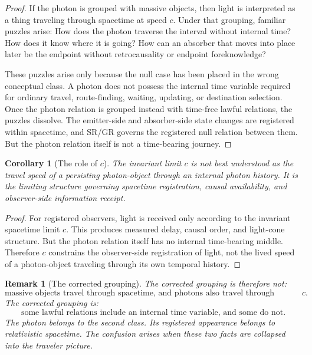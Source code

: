 \documentclass[12pt,onecolumn]{article}
\newtheorem{remark}{Remark}
\newtheorem{corollary}{Corollary}
\begin{document}
\begin{proof}
If the photon is grouped with massive objects, then light is interpreted as a thing traveling through spacetime at speed $c$. Under that grouping, familiar puzzles arise: How does the photon traverse the interval without internal time? How does it know where it is going? How can an absorber that moves into place later be the endpoint without retrocausality or endpoint foreknowledge?

These puzzles arise only because the null case has been placed in the wrong conceptual class. A photon does not possess the internal time variable required for ordinary travel, route-finding, waiting, updating, or destination selection. Once the photon relation is grouped instead with time-free lawful relations, the puzzles dissolve. The emitter-side and absorber-side state changes are registered within spacetime, and SR/GR governs the registered null relation between them. But the photon relation itself is not a time-bearing journey.
\end{proof}

\begin{corollary}[The role of $c$]
The invariant limit $c$ is not best understood as the travel speed of a persisting photon-object through an internal photon history. It is the limiting structure governing spacetime registration, causal availability, and observer-side information receipt.
\end{corollary}

\begin{proof}
For registered observers, light is received only according to the invariant spacetime limit $c$. This produces measured delay, causal order, and light-cone structure. But the photon relation itself has no internal time-bearing middle. Therefore $c$ constrains the observer-side registration of light, not the lived speed of a photon-object traveling through its own temporal history.
\end{proof}

\begin{remark}[The corrected grouping]
The corrected grouping is therefore not:
\[
\text{massive objects travel through spacetime, and photons also travel through spacetime at } c.
\]
The corrected grouping is:
\[
\text{some lawful relations include an internal time variable, and some do not.}
\]
The photon belongs to the second class. Its registered appearance belongs to relativistic spacetime. The confusion arises when these two facts are collapsed into the traveler picture.
\end{remark}
\end{document}
